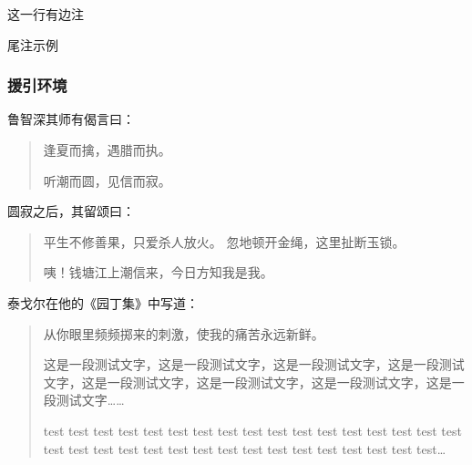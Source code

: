 \documentclass{ctexart}
\begin{document}
            这一行有边注


            尾注示例
            
        \subsubsection{援引环境}
            鲁智深其师有偈言曰：
            \begin{quote}
                逢夏而擒，遇腊而执。

                听潮而圆，见信而寂。
            \end{quote}

            圆寂之后，其留颂曰：
            \begin{quotation}
                平生不修善果，只爱杀人放火。
                忽地顿开金绳，这里扯断玉锁。

                咦！钱塘江上潮信来，今日方知我是我。
            \end{quotation}

            泰戈尔在他的《园丁集》中写道：
            \begin{verse}
                从你眼里频频掷来的刺激，使我的痛苦永远新鲜。

                这是一段测试文字，这是一段测试文字，这是一段测试文字，这是一段测试文字，这是一段测试文字，这是一段测试文字，这是一段测试文字，这是一段测试文字……

                test test test test test test test test test test test test test test test test test test test test test test test test test test test test test test test test test\ldots
            \end{verse}
\end{document}
